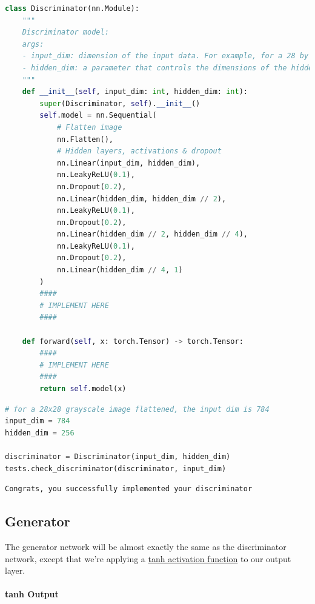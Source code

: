 \begin{lstlisting}[language=Python]
class Discriminator(nn.Module):
    """
    Discriminator model:
    args: 
    - input_dim: dimension of the input data. For example, for a 28 by 28 grayscale image, the input size is 784
    - hidden_dim: a parameter that controls the dimensions of the hidden layers. 
    """
    def __init__(self, input_dim: int, hidden_dim: int):
        super(Discriminator, self).__init__()
        self.model = nn.Sequential(
            # Flatten image
            nn.Flatten(),
            # Hidden layers, activations & dropout
            nn.Linear(input_dim, hidden_dim),
            nn.LeakyReLU(0.1),
            nn.Dropout(0.2),
            nn.Linear(hidden_dim, hidden_dim // 2),
            nn.LeakyReLU(0.1),
            nn.Dropout(0.2),
            nn.Linear(hidden_dim // 2, hidden_dim // 4),
            nn.LeakyReLU(0.1),
            nn.Dropout(0.2),
            nn.Linear(hidden_dim // 4, 1)
        )
        #### 
        # IMPLEMENT HERE
        ####
        
    def forward(self, x: torch.Tensor) -> torch.Tensor:
        #### 
        # IMPLEMENT HERE
        ####
        return self.model(x)
\end{lstlisting}

\begin{lstlisting}[language=Python]
# for a 28x28 grayscale image flattened, the input dim is 784
input_dim = 784
hidden_dim = 256

discriminator = Discriminator(input_dim, hidden_dim)
tests.check_discriminator(discriminator, input_dim)
\end{lstlisting}

\begin{lstlisting}
Congrats, you successfully implemented your discriminator
\end{lstlisting}

\subsection{Generator}\label{generator}

The generator network will be almost exactly the same as the
discriminator network, except that we're applying a
\href{https://pytorch.org/docs/stable/nn.html\#tanh}{tanh activation
function} to our output layer.

\paragraph{tanh Output}\label{tanh-output}

